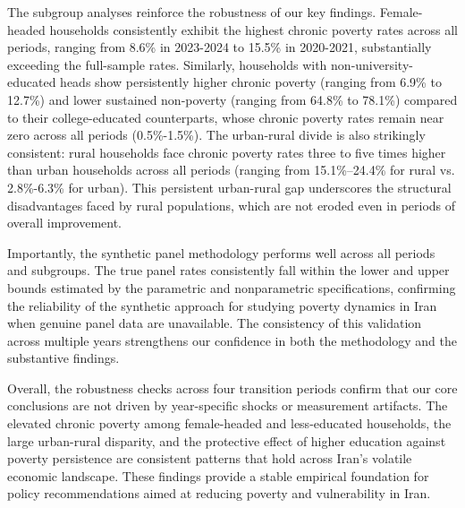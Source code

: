 \documentclass[12pt,a4paper]{article}
\begin{document}
The subgroup analyses reinforce the robustness of our key findings. Female-headed households consistently exhibit the highest chronic poverty rates across all periods, ranging from 8.6\% in 2023-2024 to 15.5\% in 2020-2021, substantially exceeding the full-sample rates. Similarly, households with non-university-educated heads show persistently higher chronic poverty (ranging from 6.9\% to 12.7\%) and lower sustained non-poverty (ranging from 64.8\% to 78.1\%) compared to their college-educated counterparts, whose chronic poverty rates remain near zero across all periods (0.5\%-1.5\%). The urban-rural divide is also strikingly consistent: rural households face chronic poverty rates three to five times higher than urban households across all periods (ranging from 15.1\%–24.4\% for rural vs. 2.8\%-6.3\% for urban). This persistent urban-rural gap underscores the structural disadvantages faced by rural populations, which are not eroded even in periods of overall improvement.

Importantly, the synthetic panel methodology performs well across all periods and subgroups. The true panel rates consistently fall within the lower and upper bounds estimated by the parametric and nonparametric specifications, confirming the reliability of the synthetic approach for studying poverty dynamics in Iran when genuine panel data are unavailable. The consistency of this validation across multiple years strengthens our confidence in both the methodology and the substantive findings.

Overall, the robustness checks across four transition periods confirm that our core conclusions are not driven by year-specific shocks or measurement artifacts. The elevated chronic poverty among female-headed and less-educated households, the large urban-rural disparity, and the protective effect of higher education against poverty persistence are consistent patterns that hold across Iran's volatile economic landscape. These findings provide a stable empirical foundation for policy recommendations aimed at reducing poverty and vulnerability in Iran.
\end{document}
